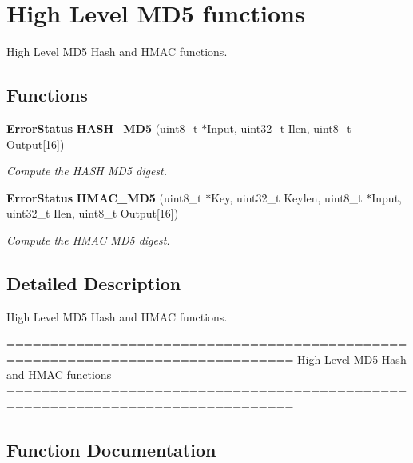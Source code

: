 \section{High Level M\+D5 functions}
\label{group__HASH__Group7}


High Level M\+D5 Hash and H\+M\+AC functions.  


\subsection*{Functions}
\begin{DoxyCompactItemize}
\item 
\textbf{ Error\+Status} \textbf{ H\+A\+S\+H\+\_\+\+M\+D5} (uint8\+\_\+t $\ast$Input, uint32\+\_\+t Ilen, uint8\+\_\+t Output[16])
\begin{DoxyCompactList}\small\item\em Compute the H\+A\+SH M\+D5 digest. \end{DoxyCompactList}\item 
\textbf{ Error\+Status} \textbf{ H\+M\+A\+C\+\_\+\+M\+D5} (uint8\+\_\+t $\ast$Key, uint32\+\_\+t Keylen, uint8\+\_\+t $\ast$Input, uint32\+\_\+t Ilen, uint8\+\_\+t Output[16])
\begin{DoxyCompactList}\small\item\em Compute the H\+M\+AC M\+D5 digest. \end{DoxyCompactList}\end{DoxyCompactItemize}


\subsection{Detailed Description}
High Level M\+D5 Hash and H\+M\+AC functions. 

\begin{DoxyVerb} ===============================================================================
                          High Level MD5 Hash and HMAC functions
 ===============================================================================\end{DoxyVerb}
 

\subsection{Function Documentation}
\mbox{\label{group__HASH__Group7_ga82a155884e458cc6b7c1a4565c1ac8e9}} 
